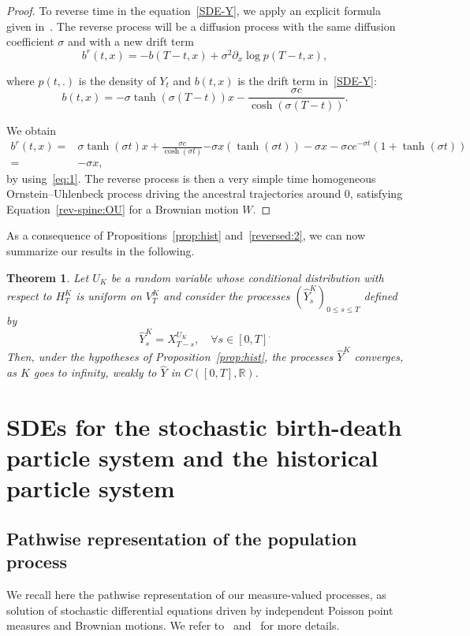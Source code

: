 \documentclass[10pt]{amsart}
\newtheorem{theo}{Theorem}[section]
\theoremstyle{definition}\newtheorem{defi}[theo]{Definition}\newtheorem{rema}[theo]{Remark}\newtheorem{exam}[theo]{Example}\newtheorem{exem}[theo]{Example}\newtheorem{nota}[theo]{Notation}
\newcommand*\R{\mathbb{R}}
\newcommand*\s{\sigma}
\let\oldforall\forall
\renewcommand*{\forall}{\mathrel{\oldforall}}
\begin{document}
\begin{proof}
To reverse time in the equation~\eqref{SDE-Y}, we apply an explicit formula given in~\cite{haussmannpardoux}. The reverse process will be a diffusion process with the same diffusion coefficient $\sigma $ and with a new drift term
\[
b^{r}(t,x)=-b(T-t,x)+\sigma^{2}\partial_{x}\log p(T-t,x),
\]

where $p(t,.)$ is the density of $ Y_{t}$ and $b(t,x)$ is the drift term in~\eqref{SDE-Y}:
\[
b(t,x)=-\sigma\tanh(\s(T-t))x-\frac{\s c}{\cosh\left(\s(T-t)\right)}.
\]

We obtain
\begin{align*}
b^{r}(t,x)= & \sigma\tanh(\s t)x+\frac{\s c}{\cosh\left(\s t \right)} {-\sigma x\left(\tanh(\s t) \right)-\sigma x-\sigma ce^{-\s t}\left(1+\tanh(\s t) \right)}\\
= & -\sigma x,
\end{align*}
by using~\eqref{eq:1}. The reverse process is then a very simple time homogeneous Ornstein--Uhlenbeck process driving the ancestral trajectories around $0$, satisfying Equation~\eqref{rev-spine:OU} for a Brownian motion $W$.
\end{proof}

As a consequence of Propositions~\ref{prop:hist} and~\ref{reversed:2}, we can now summarize our results in the following.


\begin{theo}\label{thm:conclusion}
Let $U_{K}$ be a random variable whose conditional distribution with respect to $H^{K}_{T}$ is uniform on $V^{K}_{T}$ and consider the processes $(\widehat{Y}^{K}_{s})_{0 \leq s \leq T}$ defined by
\[
\widehat{Y}^{K}_{s}=X^{U_{K}}_{T-s}, \quad \forall s\in[0,T]^.
\]
Then, under the hypotheses of Proposition~\ref{prop:hist}, the processes $\widehat{Y}^{K}$ converges, as $K$ goes to infinity, weakly to $\widehat{Y}$ in $C([0,T],\R)$.
\end{theo}




\appendix

\section{SDEs for the stochastic birth-death particle system and the historical particle system}\label{app:sde-section}


\subsection{Pathwise representation of the population process}\label{app:sde}
We recall here the pathwise representation of our measure-valued processes, as solution of stochastic differential equations driven by independent Poisson point measures and Brownian motions. We refer to~\cite{champagnatmeleard} and~\cite{meleardtran_suphist} for more details.
\end{document}

